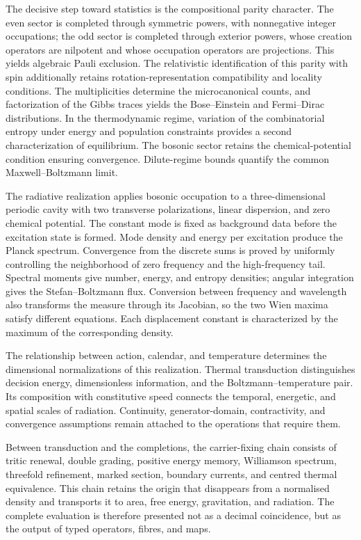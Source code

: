 The decisive step toward statistics is the compositional parity
character. The even sector is completed through symmetric powers, with
nonnegative integer occupations; the odd sector is completed through
exterior powers, whose creation operators are nilpotent and whose
occupation operators are projections. This yields algebraic Pauli
exclusion. The relativistic identification of this parity with spin
additionally retains rotation-representation compatibility and locality
conditions. The multiplicities determine the microcanonical counts,
and factorization of the Gibbs traces yields the Bose--Einstein and
Fermi--Dirac distributions. In the thermodynamic regime, variation of
the combinatorial entropy under energy and population constraints provides a second
characterization of equilibrium. The bosonic sector retains the
chemical-potential condition ensuring convergence. Dilute-regime bounds
quantify the common Maxwell--Boltzmann limit.

The radiative realization applies bosonic occupation to a
three-dimensional periodic cavity with two transverse polarizations,
linear dispersion, and zero chemical potential. The constant mode is
fixed as background data before the excitation state is formed.
Mode density and energy per excitation produce the Planck spectrum.
Convergence from the discrete sums is proved by uniformly controlling
the neighborhood of zero frequency and the high-frequency tail.
Spectral moments give number, energy, and entropy densities; angular
integration gives the Stefan--Boltzmann flux. Conversion between
frequency and wavelength also transforms the measure through its
Jacobian, so the two Wien maxima satisfy different equations.
Each displacement constant is characterized by the maximum of the
corresponding density.

The relationship between action, calendar, and temperature determines
the dimensional normalizations of this realization. Thermal transduction
distinguishes decision energy, dimensionless information, and the
Boltzmann--temperature pair. Its composition with constitutive speed
connects the temporal, energetic, and spatial scales of radiation.
Continuity, generator-domain, contractivity, and convergence assumptions
remain attached to the operations that require them.

Between transduction and the completions, the carrier-fixing chain consists of
tritic renewal, double grading, positive energy memory, Williamson spectrum,
threefold refinement, marked section, boundary currents, and centred thermal
equivalence. This chain retains the origin that disappears from a
normalised density and transports it to area, free energy, gravitation, and
radiation. The complete evaluation is therefore presented not as a decimal
coincidence, but as the output of typed operators, fibres, and maps.

